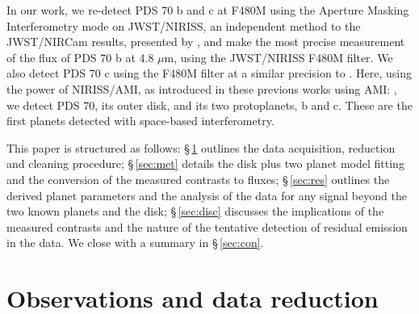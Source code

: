 \documentclass[11pt,twocolumn,twocolappendix]{aastex631}
\begin{document}
In our work, we re-detect PDS 70 b and c at F480M using {the Aperture Masking Interferometry mode on JWST/NIRISS}, %
an independent method to {the JWST/NIRCam results, presented by \cite{2024arXiv240304855C}}, and make the most precise measurement of the flux of PDS 70 b at 4.8 $\mu$m, using the JWST/NIRISS F480M filter. We also detect PDS 70 c using the F480M filter at a similar precision to \cite{2024arXiv240304855C}. 
{Here, using the power of {NIRISS/AMI}, as introduced in these previous works using AMI: \citet{2024ApJ...963..127L,2023arXiv231011508R,2023arXiv231011499S}, %
we detect PDS 70, its outer disk, and its two protoplanets, b and c. These are the first planets detected with space-based interferometry.}

This paper is structured as follows: \S\,\ref{sec:obs} outlines the data acquisition, reduction and cleaning procedure; \S\,\ref{sec:met} details the disk plus two planet model fitting and the conversion of the measured contrasts to fluxes; \S\,\ref{sec:res} outlines the derived planet parameters and the analysis of the data for any signal beyond the two known planets and the disk; \S\,\ref{sec:disc} discusses the implications of the measured contrasts and the nature of the tentative detection of residual emission in the data. We close with a summary in \S\,\ref{sec:con}.

\section{Observations and data reduction} \label{sec:obs}
\end{document}

